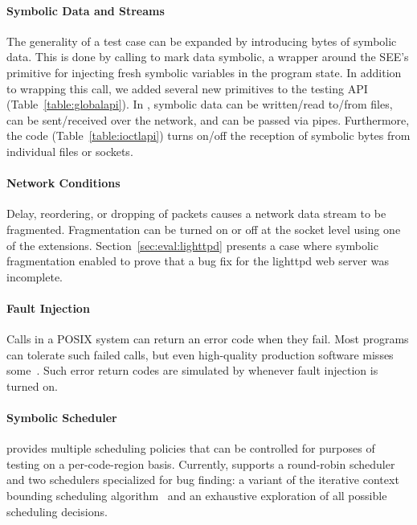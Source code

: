 \paragraph{Symbolic Data and Streams}

The generality of a test case can be expanded by introducing bytes of symbolic data.
%
This is done by calling  to mark data symbolic, a wrapper around the SEE's primitive for injecting fresh symbolic variables in the program state.
%
%
In addition to wrapping this call, we added several new primitives to the testing API (Table~\ref{table:globalapi}). In \cnine, symbolic data can be written/read to/from files, can be sent/received over the network, and can be passed via pipes. Furthermore, the   code (Table~\ref{table:ioctlapi}) turns on/off the reception of symbolic bytes from individual files or sockets.

\paragraph{Network Conditions}

Delay, reordering, or dropping of packets causes a network data stream to be fragmented.
%
Fragmentation can be turned on or off at the socket level using one of the \cnine {} extensions.  Section~\ref{sec:eval:lighttpd} presents a case where symbolic fragmentation enabled \cnine to prove that a bug fix for the lighttpd web server was incomplete. 

\paragraph{Fault Injection}

Calls in a POSIX system can return an error code when they fail.
%
Most programs can tolerate such failed calls, but even high-quality production software misses some~\cite{lfi}. Such error return codes are simulated by \cnine whenever fault injection is turned on. 

\paragraph{Symbolic Scheduler}

\cnine provides multiple scheduling policies that can be controlled for purposes of testing on a per-code-region basis.
%
Currently, \cnine supports a round-robin scheduler and two schedulers specialized for bug finding: a variant of the iterative context bounding scheduling algorithm~\cite{chess} and an exhaustive exploration of all possible scheduling decisions.  


